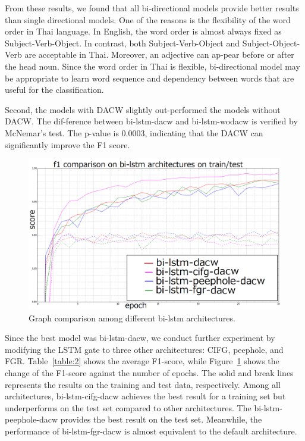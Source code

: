 From these results, we found that all bi-directional models provide better results
than single directional models.
One of the reasons is the flexibility of the word order in Thai language.
In English, the word order is almost always fixed as Subject-Verb-Object.
In contrast, both Subject-Verb-Object and Subject-Object-Verb are acceptable in Thai.
Moreover, an adjective can ap-pear before or after the head noun.
Since the word order in Thai is flexible,
bi-directional model may be appropriate to learn word sequence
and dependency between words that are useful for the classification.


Second, the models with DACW slightly out-performed the models without DACW.
The dif-ference between bi-lstm-dacw and bi-lstm-wodacw is verified by
McNemar's test. The p-value is 0.0003, indicating that the DACW can significantly
improve the F1 score.


\begin{figure}[!h]
\centering
  \includegraphics[scale=0.25]{image/6.png}
  \caption{Graph comparison among different bi-lstm architectures.}
  \label{fig:6}
\end{figure}
Since the best model was bi-lstm-dacw, we conduct further experiment by modifying
the LSTM gate to three other architectures: CIFG, peephole, and FGR.
Table~\ref{table:2} shows the average F1-score, while Figure~\ref{fig:6} 
shows the change of the F1-score against the number of epochs.
The solid and break lines represents the results on the training and test data,
respectively. 
Among all architectures, bi-lstm-cifg-dacw achieves the best 
result for a training set but underperforms on the test set
compared to other architectures. 
The bi-lstm-peephole-dacw provides the best result on the test set.
Meanwhile, the performance of bi-lstm-fgr-dacw is almost equivalent 
to the default architecture.



